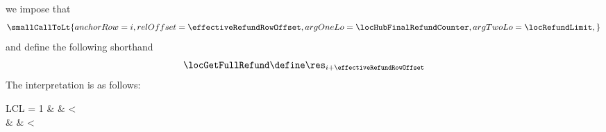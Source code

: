 \item[\underline{\underline{Row n$°(i + \effectiveRefundRowOffset)$: Effective refund:}}]
	we impose that
	\[
		\smallCallToLt {
			anchorRow = i                         ,
			relOffset = \effectiveRefundRowOffset ,
			argOneLo  = \locHubFinalRefundCounter ,
			argTwoLo  = \locRefundLimit           ,
		}
	\]
	and define the following shorthand
	\[
		\locGetFullRefund
		\define
		\res_{i + \effectiveRefundRowOffset}
	\]
	\saNote{}
	The interpretation is as follows:
	\begin{IEEEeqnarray*}{LCL}
		\locGetFullRefund = 1 & \iff & \locHubFinalRefundCounter < \locRefundLimit                                                                     \\
                                      & \iff & \locHubFinalRefundCounter < \left\lfloor\frac{\locRlpGasLimit - \locHubLeftoverGas}\maxRefundQuotient\right\rfloor \\
	\end{IEEEeqnarray*}

